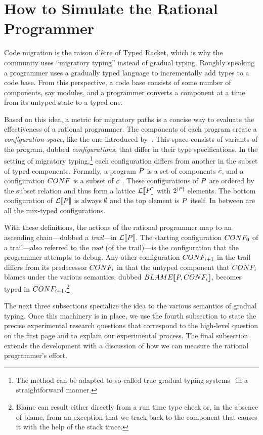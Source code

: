 \section{How to Simulate the Rational Programmer} 

Code migration is the raison d'\^etre of Typed Racket, which is why the community
uses ``migratory typing'' instead of gradual typing. Roughly speaking a
programmer uses a gradually typed language to incrementally add types to a code
base. From this perspective, a code base consists of some number of components,
say modules, and a programmer converts a component at a time from its untyped
state to a typed one. 

Based on this idea, a metric for migratory paths is a concise way to
evaluate the effectiveness of a
rational programmer. The components of each program create a \emph{configuration
space}, like the one introduced by~\citet{tfgnvf-popl-2016}. This space consists
of variants of the program, dubbed \emph{configurations}, that differ in their
type specifications. In the setting of migratory typing,\footnote{The method can
be adapted to so-called true gradual typing systems~\cite{svcb-snapl-2015} in a
straightforward manner.} each configuration differs from another in the subset
of typed components. Formally, a program $P$ is a set of components
$\bar{c}$, and a configuration $CONF$ is a subset of
$\bar{c}$ . These configurations of $P$ are ordered by the subset
relation and thus form a lattice $\mathcal{L}\llbracket P\rrbracket$ with $2^{\mid P \mid}$
elements.  The bottom configuration of $\mathcal{L}\llbracket P\rrbracket$ is always $\emptyset$
and the top element is $P$ itself. In between are all the mix-typed
configurations.

With these definitions, the actions of the rational programmer map to an
ascending chain---dubbed a \emph{trail}---in $\mathcal{L}\llbracket P\rrbracket$.  The starting
configuration $CONF_0$ of a trail---also referred to the \emph{root} (of the
trail)---is the configuration that the programmer attempts to debug. Any other
configuration $CONF_{i+1}$ in the trail differs from its predecessor
$CONF_{i}$ in that the untyped component that $CONF_i$ blames under the
various semantics, dubbed $BLAME\llbracket P, CONF_i\rrbracket$, becomes typed in
$CONF_{i+1}$.\footnote{Blame can result either directly from a run time type
check or, in the absence of blame, from an exception that we track back to the
component that causes it with the help of the stack trace.}

The next three subsections specialize the idea to the various semantics of
gradual typing. Once this machinery is in place, we use the fourth subsection to
state the precise experimental research questions that correspond to the
high-level question on the first page and to explain our experimental
process. The final subsection extends the development with a discussion of
how we can measure the rational programmer's effort. 


